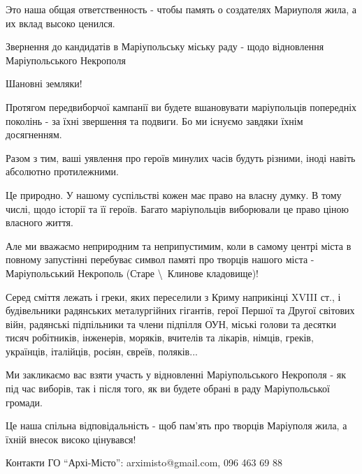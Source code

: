 Это наша общая ответственность - чтобы память о создателях Мариуполя жила, а их
вклад высоко ценился. 

Звернення до кандидатів в Маріупольську міську раду - щодо відновлення
Маріупольського Некрополя

Шановні земляки!

Протягом передвиборчої кампанії ви будете вшановувати маріупольців попередніх
поколінь - за їхні звершення та подвиги. Бо ми існуємо завдяки їхнім
досягненням.

Разом з тим, ваші уявлення про героїв минулих часів будуть різними, іноді
навіть абсолютно протилежними. 

Це природно. У нашому суспільстві кожен має право на власну думку. В тому
числі, щодо історії та її героїв. Багато маріупольців виборювали це право ціною
власного життя.

Але ми вважаємо неприродним та неприпустимим, коли в самому центрі міста в
повному запустінні перебуває символ памяті  про творців нашого міста -
Маріупольський Некрополь (Старе \textbackslash\ Клинове кладовище)! 

Серед сміття лежать і греки, яких переселили з Криму наприкінці XVIII ст., і
будівельники радянських металургійних гігантів, герої Першої та Другої світових
війн, радянські підпільники та члени підпілля ОУН, міські голови та десятки
тисяч робітників, інженерів, моряків, вчителів та лікарів, німців, греків,
українців, італійців, росіян, євреїв, поляків...

Ми закликаємо вас взяти участь у відновленні Маріупольського Некрополя - як під
час виборів, так і після того, як ви будете обрані в раду Маріупольської
громади.

Це наша спільна відповідальність - щоб пам'ять про творців Маріуполя жила, а
їхній внесок високо цінувався!

Контакти ГО \enquote{Архі-Місто}: arximisto@gmail.com, 096 463 69 88
